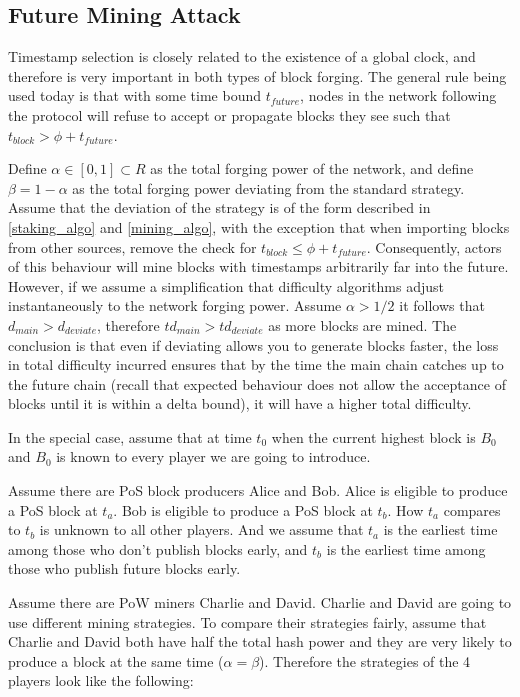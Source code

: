 \documentclass[a4paper]{article}
\begin{document}
\clearpage
\begin{appendices}
\section{Future Mining Attack}
\label{future_mining_attack}

Timestamp selection is closely related to the existence of a global clock, and therefore is very important in both types of block forging. The general rule being used today is that with some time bound $t_{future}$, nodes in the network following the protocol will refuse to accept or propagate blocks they see such that $t_{block} > \phi + t_{future}$.

Define $\alpha \in [0, 1] \subset R $ as the total forging power of the network, and define $\beta = 1-\alpha$ as the total forging power deviating from the standard strategy. Assume that the deviation of the strategy is of the form described in \cref{staking_algo} and \cref{mining_algo}, with the exception that when importing blocks from other sources, remove the check for $t_{block} \leq \phi + t_{future}$. Consequently, actors of this behaviour will mine blocks with timestamps arbitrarily far into the future. However, if we assume a simplification that difficulty algorithms adjust instantaneously to the network forging power. Assume $\alpha > 1/2$ it follows that $d_{main} > d_{deviate}$, therefore $td_{main} > td_{deviate}$ as more blocks are mined. The conclusion is that even if deviating allows you to generate blocks faster, the loss in total difficulty incurred ensures that by the time the main chain catches up to the future chain (recall that expected behaviour does not allow the acceptance of blocks until it is within a delta bound), it will have a higher total difficulty.

In the special case, assume that at time $t_0$ when the current highest block is $B_0$ and $B_0$ is known to every player we are going to introduce.

Assume there are PoS block producers Alice and Bob. Alice is eligible to produce a PoS block at $t_a$. Bob is eligible to produce a PoS block at $t_b$. How $t_a$ compares to $t_b$ is unknown to all other players. And we assume that $t_a$ is the earliest time among those who don't publish blocks early, and $t_b$ is the earliest time among those who publish future blocks early.

Assume there are PoW miners Charlie and David. Charlie and David are going to use different mining strategies. To compare their strategies fairly, assume that Charlie and David both have half the total hash power and they are very likely to produce a block at the same time ($\alpha = \beta$). Therefore the strategies of the 4 players look like the following:


\end{appendices}
\end{document}
